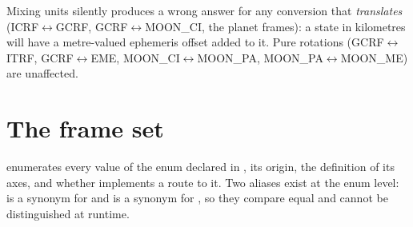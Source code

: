 \begin{lupntwarning}
  Mixing units silently produces a wrong answer for any conversion that
  \emph{translates} (ICRF$\leftrightarrow$GCRF,
  GCRF$\leftrightarrow$MOON\_CI, the planet frames): a state in kilometres
  will have a metre-valued ephemeris offset added to it. Pure rotations
  (GCRF$\leftrightarrow$ITRF, GCRF$\leftrightarrow$EME,
  MOON\_CI$\leftrightarrow$MOON\_PA, MOON\_PA$\leftrightarrow$MOON\_ME) are
  unaffected.
\end{lupntwarning}

\section{The frame set}
\label{sec:fc-frames}

 enumerates every value of the  enum declared
in , its origin, the definition
of its axes, and whether  implements a route to it.
Two aliases exist at the enum level:  is a synonym for
 and  is a synonym for , so they compare
equal and cannot be distinguished at runtime.

